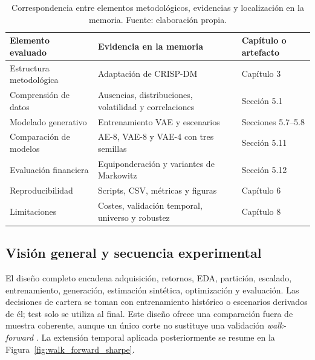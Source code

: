\begin{table}[htbp]
\centering
\small
\begin{tabular}{p{}p{}p{}}
\toprule
Elemento evaluado & Evidencia en la memoria & Capítulo o artefacto \\
\midrule
Estructura metodológica & Adaptación de CRISP-DM & Capítulo 3 \\
Comprensión de datos & Ausencias, distribuciones, volatilidad y correlaciones & Sección 5.1 \\
Modelado generativo & Entrenamiento VAE y escenarios & Secciones 5.7--5.8 \\
Comparación de modelos & AE-8, VAE-8 y VAE-4 con tres semillas & Sección 5.11 \\
Evaluación financiera & Equiponderación y variantes de Markowitz & Sección 5.12 \\
Reproducibilidad & Scripts, CSV, métricas y figuras & Capítulo 6 \\
Limitaciones & Costes, validación temporal, universo y robustez & Capítulo 8 \\
\bottomrule
\end{tabular}
\caption{Correspondencia entre elementos metodológicos, evidencias y localización en la memoria. Fuente: elaboración propia.}
\label{tab:garantias_metodologicas}
\end{table}

\subsection{Visión general y secuencia experimental}
El diseño completo encadena adquisición, retornos, EDA, partición, escalado, entrenamiento, generación, estimación sintética, optimización y evaluación. Las decisiones de cartera se toman con entrenamiento histórico o escenarios derivados de él; test solo se utiliza al final. Este diseño ofrece una comparación fuera de muestra coherente, aunque un único corte no sustituye una validación \textit{walk-forward} \cite{bailey2017probability}. La extensión temporal aplicada posteriormente se resume en la Figura~\ref{fig:walk_forward_sharpe}.


